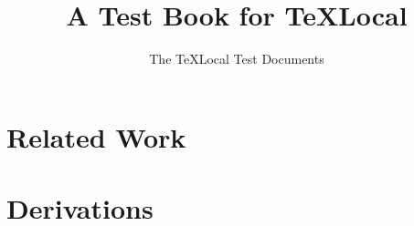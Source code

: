 \documentclass[11pt]{report}
\title{A Test Book for TeXLocal}
\author{The TeXLocal Test Documents}
\begin{document}
\maketitle
\tableofcontents
\listoffigures





\chapter{Related Work}


\appendix
\chapter{Derivations}


\printbibliography[heading=bibintoc]
\end{document}
